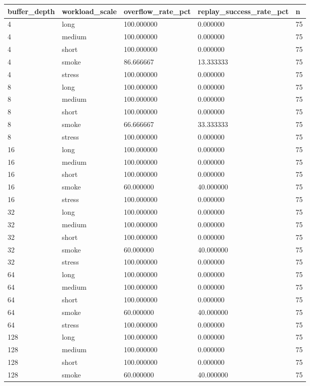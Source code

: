 \begin{tabular}{lllll}
 \hline
buffer\_depth & workload\_scale & overflow\_rate\_pct & replay\_success\_rate\_pct & n \\
 \hline
4 & long & 100.000000 & 0.000000 & 75 \\
4 & medium & 100.000000 & 0.000000 & 75 \\
4 & short & 100.000000 & 0.000000 & 75 \\
4 & smoke & 86.666667 & 13.333333 & 75 \\
4 & stress & 100.000000 & 0.000000 & 75 \\
8 & long & 100.000000 & 0.000000 & 75 \\
8 & medium & 100.000000 & 0.000000 & 75 \\
8 & short & 100.000000 & 0.000000 & 75 \\
8 & smoke & 66.666667 & 33.333333 & 75 \\
8 & stress & 100.000000 & 0.000000 & 75 \\
16 & long & 100.000000 & 0.000000 & 75 \\
16 & medium & 100.000000 & 0.000000 & 75 \\
16 & short & 100.000000 & 0.000000 & 75 \\
16 & smoke & 60.000000 & 40.000000 & 75 \\
16 & stress & 100.000000 & 0.000000 & 75 \\
32 & long & 100.000000 & 0.000000 & 75 \\
32 & medium & 100.000000 & 0.000000 & 75 \\
32 & short & 100.000000 & 0.000000 & 75 \\
32 & smoke & 60.000000 & 40.000000 & 75 \\
32 & stress & 100.000000 & 0.000000 & 75 \\
64 & long & 100.000000 & 0.000000 & 75 \\
64 & medium & 100.000000 & 0.000000 & 75 \\
64 & short & 100.000000 & 0.000000 & 75 \\
64 & smoke & 60.000000 & 40.000000 & 75 \\
64 & stress & 100.000000 & 0.000000 & 75 \\
128 & long & 100.000000 & 0.000000 & 75 \\
128 & medium & 100.000000 & 0.000000 & 75 \\
128 & short & 100.000000 & 0.000000 & 75 \\
128 & smoke & 60.000000 & 40.000000 & 75 \\

\end{tabular}
